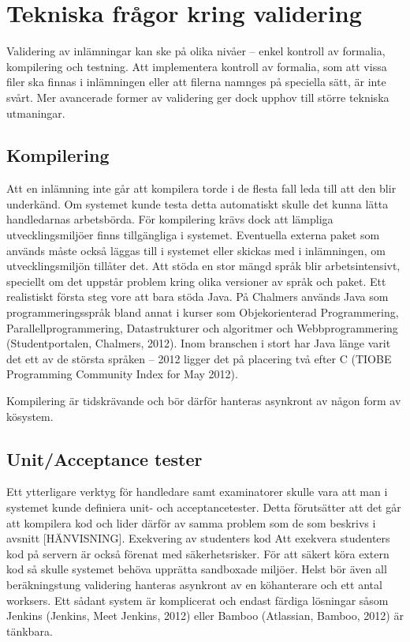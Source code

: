 \section{Tekniska frågor kring validering}

Validering av inlämningar kan ske på olika nivåer – enkel kontroll av formalia, kompilering och testning. 
Att implementera kontroll av formalia, som att vissa filer ska finnas i inlämningen eller att filerna namnges på speciella sätt, är inte svårt. Mer avancerade former av validering ger dock upphov till större tekniska utmaningar.

\subsection{Kompilering}

Att en inlämning inte går att kompilera torde i de flesta fall leda till att den blir underkänd. Om systemet kunde testa detta automatiskt skulle det kunna lätta handledarnas arbetsbörda.
För kompilering krävs dock att lämpliga utvecklingsmiljöer finns tillgängliga i systemet. Eventuella externa paket som används måste också läggas till i systemet eller skickas med i inlämningen, om utvecklingsmiljön tillåter det.
Att stöda en stor mängd språk blir arbetsintensivt, speciellt om det uppstår problem kring olika versioner av språk och paket.
Ett realistiskt första steg vore att bara stöda Java. På Chalmers används Java som programmeringsspråk bland annat i kurser som Objekorienterad Programmering, Parallellprogrammering, Datastrukturer och algoritmer och Webbprogrammering (Studentportalen, Chalmers, 2012). Inom branschen i stort har Java länge varit det ett av de största språken – 2012 ligger det på placering två efter C (TIOBE Programming Community Index for May 2012).

Kompilering är tidskrävande och bör därför hanteras asynkront av någon form av kösystem.

\subsection{Unit/Acceptance tester}
Ett ytterligare verktyg för handledare samt examinatorer skulle vara att man i systemet kunde definiera unit- och acceptancetester. Detta förutsätter att det går att kompilera kod och lider därför av samma problem som de som beskrivs i avsnitt [HÄNVISNING].
Exekvering av studenters kod
Att exekvera studenters kod på servern är också förenat med säkerhetsrisker.
För att säkert köra extern kod så skulle systemet behöva upprätta sandboxade miljöer. Helst bör även all beräkningstung validering hanteras asynkront av en köhanterare och ett antal worksers. Ett sådant system är komplicerat och endast färdiga lösningar såsom Jenkins (Jenkins, Meet Jenkins, 2012) eller Bamboo (Atlassian, Bamboo, 2012) är tänkbara.

